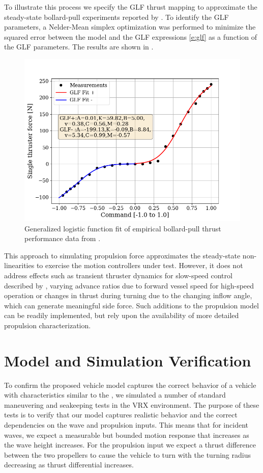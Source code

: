\documentclass[utf8]{frontiersSCNS} %
\begin{document}
To illustrate this process we specify the GLF thrust mapping to approximate the  steady-state bollard-pull experiments reported by \citet{sarda16station}.  To identify the GLF parameters, a Nelder-Mean simplex optimization was performed to minimize the squared error between the model and the GLF expressions \eqref{e:glf} as a function of the GLF parameters.  The results are shown in .
\begin{figure}[h]
  \centering
  \includegraphics[width=\SFc\textwidth]{src/wamv_glf_annote.png}
  \caption{Generalized logistic function fit of empirical  bollard-pull thrust performance data from \citep{sarda16station}.}
  \label{f:fit}
\end{figure}

This approach to simulating propulsion force approximates the steady-state non-linearities to exercise the motion controllers under test.  However, it does not address effects such as transient thruster dynamics for slow-speed control described by \citet{whitcomb99development}, varying advance ratios due to forward vessel speed for high-speed operation or changes in thrust during turning due to the changing inflow angle, which can generate meaningful side force.  Such additions to the propulsion model can be readily implemented, but rely upon the availability of more detailed propulsion characterization.
%
\color{red}
\section{Model and Simulation Verification}
%
To confirm the proposed vehicle model captures the correct behavior of a vehicle with characteristics similar to the \wamv{}, we simulated a number of standard maneuvering and seakeeping tests in the VRX environment. The purpose of these tests is to verify that our model captures realistic behavior and the correct dependencies on the wave and propulsion inputs. This means that for incident waves, we expect a measurable but bounded motion response that increases as the wave height increases. For the propulsion input we expect a thrust difference between the two propellers to cause the vehicle to turn with the turning radius decreasing as thrust differential increases.
\end{document}
